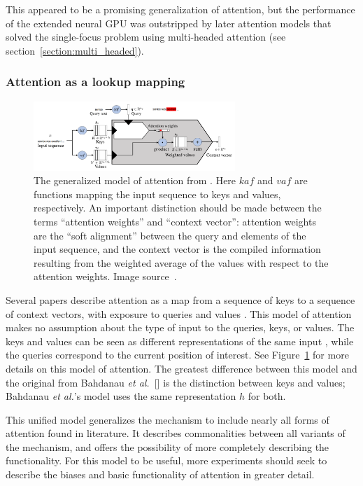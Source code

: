 \documentclass{article}
\newcommand{\etal}{\textit{et al.}}
\begin{document}
This appeared to be a promising generalization of attention, but the performance of the extended neural GPU was outstripped by later attention models that solved the single-focus problem using multi-headed attention \cite{attn_all_you_need} (see section~\ref{section:multi_headed}).

\subsubsection{Attention as a lookup mapping}

\begin{figure}
    \centering
    \includegraphics[width=3in]{figures/queries_keys_values.png}
\caption{The generalized model of attention from \protect\cite{attention_please}. Here $kaf$ and $vaf$ are functions mapping the input sequence to keys and values, respectively. An important distinction should be made between the terms ``attention weights'' and ``context vector'': attention weights are the ``soft alignment'' between the query and elements of the input sequence, and the context vector is the compiled information resulting from the weighted average of the values with respect to the attention weights. Image source~\protect\cite{attention_please}.}\label{figure:queries_keys_values}
\end{figure}

Several papers describe attention as a map from a sequence of keys to a sequence of context vectors, with exposure to queries and values \cite{attn_all_you_need,attention_please}. This model of attention makes no assumption about the type of input to the queries, keys, or values. The keys and values can be seen as different representations of the same input \cite{attention_please}, while the queries correspond to the current position of interest. See Figure~\ref{figure:queries_keys_values} for more details on this model of attention. The greatest difference between this model and the original from Bahdanau \etal~[\citeyear{joint_align_translate}] is the distinction between keys and values; Bahdanau \etal's model uses the same representation $h$ for both.

This unified model generalizes the mechanism to include nearly all forms of attention found in literature. It describes commonalities between all variants of the mechanism, and offers the possibility of more completely describing the functionality. For this model to be useful, more experiments should seek to describe the biases and basic functionality of attention in greater detail.
\end{document}
